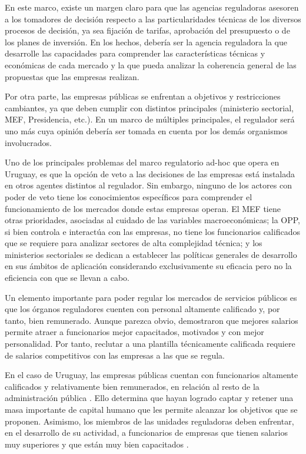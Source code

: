 \documentclass[
  12pt,
  spanish,
]{book}
\begin{document}
En este marco, existe un margen claro para que las agencias reguladoras
asesoren a los tomadores de decisión respecto a las particularidades
técnicas de los diversos procesos de decisión, ya sea fijación de
tarifas, aprobación del presupuesto o de los planes de inversión. En los
hechos, debería ser la agencia reguladora la que desarrolle las
capacidades para comprender las características técnicas y económicas de
cada mercado y la que pueda analizar la coherencia general de las
propuestas que las empresas realizan.

Por otra parte, las empresas públicas se enfrentan a objetivos y
restricciones cambiantes, ya que deben cumplir con distintos principales
(ministerio sectorial, MEF, Presidencia, etc.). En un marco de múltiples
principales, el regulador será uno más cuya opinión debería ser tomada
en cuenta por los demás organismos involucrados.

Uno de los principales problemas del marco regulatorio ad-hoc que opera
en Uruguay, es que la opción de veto a las decisiones de las empresas
está instalada en otros agentes distintos al regulador. Sin embargo,
ninguno de los actores con poder de veto tiene los conocimientos
específicos para comprender el funcionamiento de los mercados donde
estas empresas operan. El MEF tiene otras prioridades, asociadas al
cuidado de las variables macroeconómicas; la OPP, si bien controla e
interactúa con las empresas, no tiene los funcionarios calificados que
se requiere para analizar sectores de alta complejidad técnica; y los
ministerios sectoriales se dedican a establecer las políticas generales
de desarrollo en sus ámbitos de aplicación considerando exclusivamente
su eficacia pero no la eficiencia con que se llevan a cabo.

Un elemento importante para poder regular los mercados de servicios
públicos es que los órganos reguladores cuenten con personal altamente
calificado y, por tanto, bien remunerado. Aunque parezca obvio,
\citet{DalBo2013} demostraron que mejores salarios permite atraer a
funcionarios mejor capacitados, motivados y con mejor personalidad. Por
tanto, reclutar a una plantilla técnicamente calificada requiere de
salarios competitivos con las empresas a las que se regula.

En el caso de Uruguay, las empresas públicas cuentan con funcionarios
altamente calificados y relativamente bien remunerados, en relación al
resto de la administración pública \citep{Bergara2005}. Ello determina
que hayan logrado captar y retener una masa importante de capital humano
que les permite alcanzar los objetivos que se proponen. Asimismo, los
miembros de las unidades reguladoras deben enfrentar, en el desarrollo
de su actividad, a funcionarios de empresas que tienen salarios muy
superiores y que están muy bien capacitados \citep{Bergara2005}.
\end{document}
